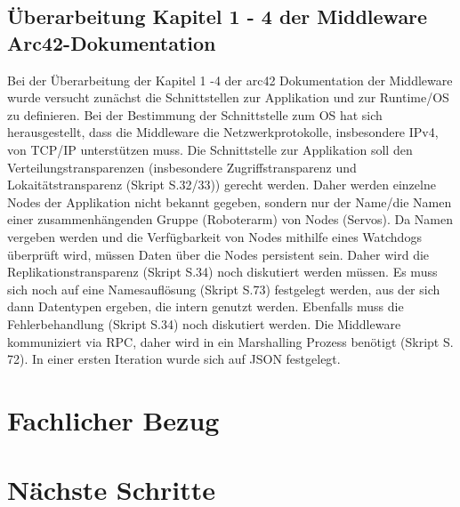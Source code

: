 \documentclass{article}
\begin{document}
\subsection{Überarbeitung Kapitel 1 - 4 der Middleware Arc42-Dokumentation} 
Bei der Überarbeitung der Kapitel 1 -4 der arc42 Dokumentation der Middleware wurde versucht zunächst die Schnittstellen zur Applikation und zur Runtime/OS zu definieren. Bei der Bestimmung der Schnittstelle zum OS hat sich herausgestellt, dass die Middleware die Netzwerkprotokolle, insbesondere IPv4, von TCP/IP unterstützen muss. Die Schnittstelle zur Applikation soll den Verteilungstransparenzen (insbesondere Zugriffstransparenz und Lokaitätstransparenz (Skript S.32/33)) gerecht werden. Daher werden einzelne Nodes der Applikation nicht bekannt gegeben, sondern nur der Name/die Namen einer zusammenhängenden Gruppe (Roboterarm) von Nodes (Servos). Da Namen vergeben werden und die Verfügbarkeit von Nodes mithilfe eines Watchdogs überprüft wird, müssen Daten über die Nodes persistent sein. Daher wird die Replikationstransparenz (Skript S.34) noch diskutiert werden müssen. Es muss sich noch auf eine Namesauflösung (Skript S.73) festgelegt werden, aus der sich dann Datentypen ergeben, die intern genutzt werden. Ebenfalls muss die Fehlerbehandlung (Skript S.34) noch diskutiert werden. Die Middleware kommuniziert via RPC, daher wird in ein Marshalling Prozess benötigt (Skript S. 72). In einer ersten Iteration wurde sich auf JSON festgelegt. 




\section{Fachlicher Bezug}






\clearpage


\section{Nächste Schritte}
\end{document}

